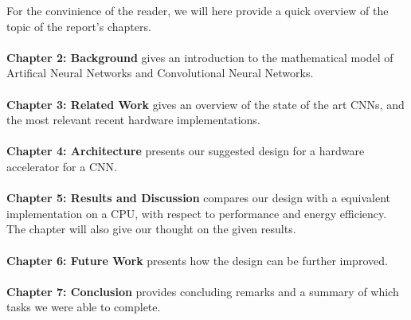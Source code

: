 For the convinience of the reader, we will here provide a quick overview of the topic of the report's chapters. \\ \hfil \\ \hfil
\textbf{Chapter 2: Background} gives an introduction to the mathematical model of Artifical Neural Networks and Convolutional Neural Networks. \\ \hfil \\ \hfil
\textbf{Chapter 3: Related Work} gives an overview of the state of the art CNNs, and the most relevant recent hardware implementations. \\ \hfil \\ \hfil
\textbf{Chapter 4: Architecture} presents our suggested design for a hardware accelerator for a CNN.  \\ \hfil \\ \hfil
\textbf{Chapter 5: Results and Discussion} compares our design with a equivalent implementation on a CPU, with respect to performance and energy efficiency. The chapter will also give our thought on the given results.  \\ \hfil \\ \hfil
\textbf{Chapter 6: Future Work} presents how the design can be further improved. \\ \hfil \\ \hfil
\textbf{Chapter 7: Conclusion} provides concluding remarks and a summary of which tasks we were able to complete.\\ \hfil \\ \hfil



